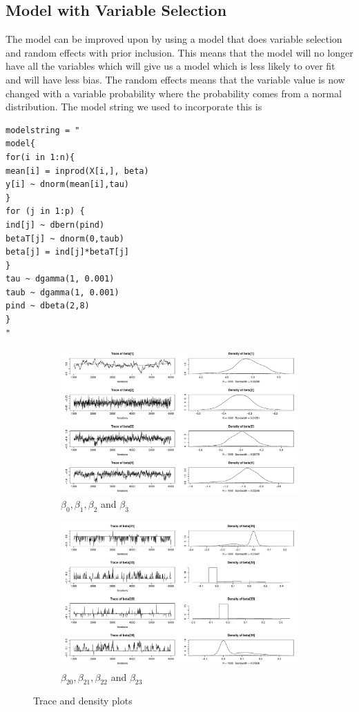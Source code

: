 \documentclass{article}
\begin{document}
\subsection{Model with Variable Selection}
The model can be improved upon by using a model that does variable selection and random effects with prior inclusion. This means that the model will no longer have all the variables which will give us a model which is less likely to over fit and will have less bias. The random effects means that the variable value is now changed with a variable probability where the probability comes from a normal distribution. The model string we used to incorporate this is
{\small
\begin{verbatim}
modelstring = "
model{
for(i in 1:n){
mean[i] = inprod(X[i,], beta)
y[i] ~ dnorm(mean[i],tau)
}
for (j in 1:p) {
ind[j] ~ dbern(pind)
betaT[j] ~ dnorm(0,taub)
beta[j] = ind[j]*betaT[j]
}
tau ~ dgamma(1, 0.001)
taub ~ dgamma(1, 0.001)
pind ~ dbeta(2,8)
}
"
\end{verbatim}
}
\begin{figure}[H]
\centering
	\begin{subfigure}[b]{0.49\textwidth}
		\includegraphics[width = \textwidth]{micePlot.pdf}
\caption{$\beta_0, \beta_1, \beta_2$ and $\beta_3$}
\label{micePlot}
	\end{subfigure}
	\begin{subfigure}[b]{0.49\textwidth}
\includegraphics[width = \textwidth]{notIncludedBetas.pdf}
\caption{$\beta_{20}, \beta_{21}, \beta_{22}$ and $\beta_{23}$}
\label{notIncluded}
\end{subfigure}
\caption{Trace and density plots}
\end{figure}
\end{document}
